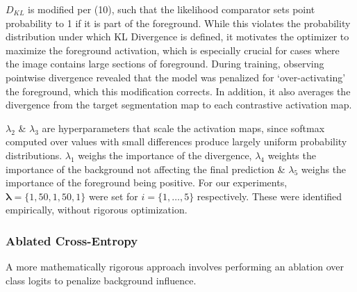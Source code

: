 \documentclass{article}
\begin{document}
$D_{KL}$ is modified per (10), such that the likelihood comparator sets point probability to 1 if it is part of the foreground. While this violates the probability distribution under which KL Divergence is defined, it motivates the optimizer to maximize the foreground activation, which is especially crucial for cases where the image contains large sections of foreground. During training, observing pointwise divergence revealed that the model was penalized for `over-activating' the foreground, which this modification corrects. In addition, it also averages the divergence from the target segmentation map to each contrastive activation map.

$\lambda_2$ \& $\lambda_3$ are hyperparameters that scale the activation maps, since softmax computed over values with small differences produce largely uniform probability distributions. $\lambda_1$ weighs the importance of the divergence, $\lambda_4$ weights the importance of the background not affecting the final prediction \& $\lambda_5$ weighs the importance of the foreground being positive. For our experiments, $\bm{\lambda} = \{1, 50, 1, 50, 1\}$ were set for $i = \{1, \ldots, 5\}$ respectively. These were identified empirically, without rigorous optimization.

\subsubsection{Ablated Cross-Entropy}

A more mathematically rigorous approach involves performing an ablation over class logits to penalize background influence.
\end{document}
